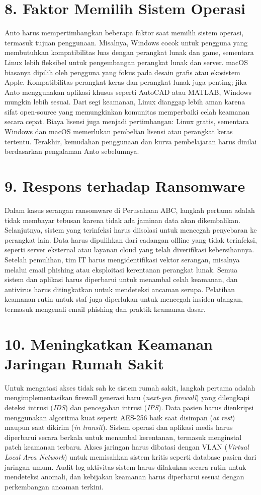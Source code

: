 \documentclass{article}
\begin{document}
\section*{8. Faktor Memilih Sistem Operasi}
Anto harus mempertimbangkan beberapa faktor saat memilih sistem operasi, termasuk tujuan penggunaan. Misalnya, Windows cocok untuk pengguna yang membutuhkan kompatibilitas luas dengan perangkat lunak dan game, sementara Linux lebih fleksibel untuk pengembangan perangkat lunak dan server. macOS biasanya dipilih oleh pengguna yang fokus pada desain grafis atau ekosistem Apple. Kompatibilitas perangkat keras dan perangkat lunak juga penting; jika Anto menggunakan aplikasi khusus seperti AutoCAD atau MATLAB, Windows mungkin lebih sesuai. Dari segi keamanan, Linux dianggap lebih aman karena sifat open-source yang memungkinkan komunitas memperbaiki celah keamanan secara cepat. Biaya lisensi juga menjadi pertimbangan: Linux gratis, sementara Windows dan macOS memerlukan pembelian lisensi atau perangkat keras tertentu. Terakhir, kemudahan penggunaan dan kurva pembelajaran harus dinilai berdasarkan pengalaman Anto sebelumnya.

\section*{9. Respons terhadap Ransomware}
Dalam kasus serangan ransomware di Perusahaan ABC, langkah pertama adalah tidak membayar tebusan karena tidak ada jaminan data akan dikembalikan. Selanjutnya, sistem yang terinfeksi harus diisolasi untuk mencegah penyebaran ke perangkat lain. Data harus dipulihkan dari cadangan offline yang tidak terinfeksi, seperti server eksternal atau layanan cloud yang telah diverifikasi kebersihannya. Setelah pemulihan, tim IT harus mengidentifikasi vektor serangan, misalnya melalui email phishing atau eksploitasi kerentanan perangkat lunak. Semua sistem dan aplikasi harus diperbarui untuk menambal celah keamanan, dan antivirus harus ditingkatkan untuk mendeteksi ancaman serupa. Pelatihan keamanan rutin untuk staf juga diperlukan untuk mencegah insiden ulangan, termasuk mengenali email phishing dan praktik keamanan dasar.

\section*{10. Meningkatkan Keamanan Jaringan Rumah Sakit}
Untuk mengatasi akses tidak sah ke sistem rumah sakit, langkah pertama adalah mengimplementasikan firewall generasi baru (\textit{next-gen firewall}) yang dilengkapi deteksi intrusi (\textit{IDS}) dan pencegahan intrusi (\textit{IPS}). Data pasien harus dienkripsi menggunakan algoritma kuat seperti AES-256 baik saat disimpan (\textit{at rest}) maupun saat dikirim (\textit{in transit}). Sistem operasi dan aplikasi medis harus diperbarui secara berkala untuk menambal kerentanan, termasuk menginstal patch keamanan terbaru. Akses jaringan harus dibatasi dengan VLAN (\textit{Virtual Local Area Network}) untuk memisahkan sistem kritis seperti database pasien dari jaringan umum. Audit log aktivitas sistem harus dilakukan secara rutin untuk mendeteksi anomali, dan kebijakan keamanan harus diperbarui sesuai dengan perkembangan ancaman terkini.
\end{document}
